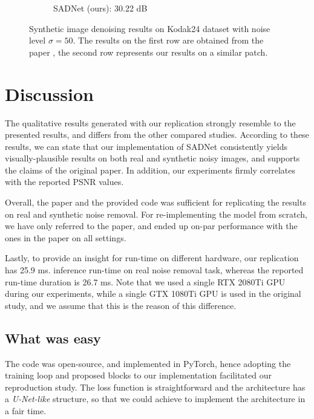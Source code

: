 \begin{figure}[t!]
\begin{subfigure}{0.28\textwidth}
      \caption{SADNet (ours): 30.22 dB}
      \label{fig:kodak_out}
    \end{subfigure}
    \caption{Synthetic image denoising results on Kodak24 dataset with noise level $\sigma = 50$. The results on the first row are obtained from the paper \cite{10.1007/978-3-030-58577-8_11}, the second row represents our results on a similar patch.}
    \label{fig:kodak_table}
\end{figure}


\section{Discussion}


The qualitative results generated with our replication strongly resemble to the presented results, and differs from the other compared studies. According to these results, we can state that our implementation of SADNet consistently yields visually-plausible results on both real and synthetic noisy images, and supports the claims of the original paper. In addition, our experiments firmly correlates with the reported PSNR values.

Overall, the paper and the provided code was sufficient for replicating the results on real and synthetic noise removal. For re-implementing the model from scratch, we have only referred to the paper, and ended up on-par performance with the ones in the paper on all settings. 

Lastly, to provide an insight for run-time on different hardware, our replication has 25.9 ms. inference run-time on real noise removal task, whereas the reported run-time duration is 26.7 ms. Note that we used a single RTX 2080Ti GPU during our experiments, while a single GTX 1080Ti GPU is used in the original study, and we assume that this is the reason of this difference.

\subsection{What was easy}

The code was open-source, and implemented in PyTorch, hence adopting the training loop and proposed blocks to our implementation facilitated our reproduction study. The loss function is straightforward and the architecture has a \textit{U-Net-like} structure, so that we could achieve to implement the architecture in a fair time. 

